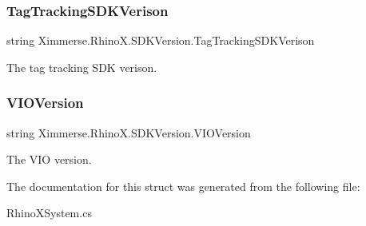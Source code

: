 \subsubsection{\texorpdfstring{Tag\+Tracking\+S\+D\+K\+Verison}{TagTrackingSDKVerison}}
{\footnotesize\ttfamily string Ximmerse.\+Rhino\+X.\+S\+D\+K\+Version.\+Tag\+Tracking\+S\+D\+K\+Verison}



The tag tracking S\+DK verison. 

\mbox{\label{struct_ximmerse_1_1_rhino_x_1_1_s_d_k_version_ae439edef76e7f763815d61ba8a167636}} 
\subsubsection{\texorpdfstring{V\+I\+O\+Version}{VIOVersion}}
{\footnotesize\ttfamily string Ximmerse.\+Rhino\+X.\+S\+D\+K\+Version.\+V\+I\+O\+Version}



The V\+IO version. 



The documentation for this struct was generated from the following file\+:\begin{DoxyCompactItemize}
\item 
Rhino\+X\+System.\+cs\end{DoxyCompactItemize}
